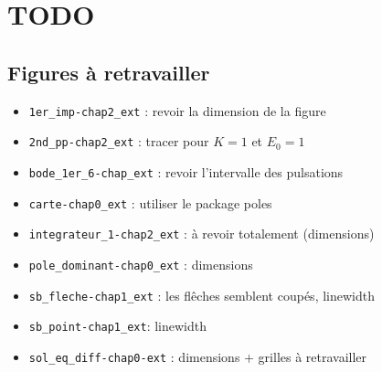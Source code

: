 \chapter{TODO}

\section*{Figures à retravailler}
\begin{itemize}
    \item \verb?1er_imp-chap2_ext? : revoir la dimension de la figure
    \item \verb?2nd_pp-chap2_ext? : tracer pour $K=1$ et $E_0=1$
    \item \verb?bode_1er_6-chap_ext? : revoir l'intervalle des pulsations
    \item \verb?carte-chap0_ext? : utiliser le package poles
    \item \verb?integrateur_1-chap2_ext? : à revoir totalement (dimensions)
    \item \verb?pole_dominant-chap0_ext? : dimensions
    \item \verb?sb_fleche-chap1_ext? : les flêches semblent coupés, linewidth
    \item \verb?sb_point-chap1_ext?: linewidth
    \item \verb?sol_eq_diff-chap0-ext? : dimensions + grilles à retravailler
\end{itemize}

